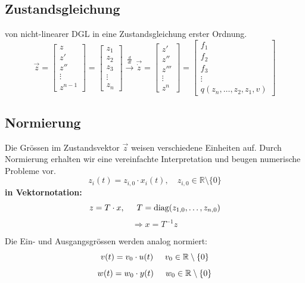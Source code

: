     \subsection{Zustandsgleichung}
	    von nicht-linearer DGL in eine Zustandsgleichung erster Ordnung. 
 	    \[\vec{z} = \begin{bmatrix} z \\ z' \\ z'' \\ \vdots \\z^{n-1} \end{bmatrix}  = \begin{bmatrix} z_1 \\ z_2 \\ z_3 \\ \vdots \\z_n \end{bmatrix}
         \xrightarrow{\frac{d}{dt}} \vec{\dot{z}} = \begin{bmatrix} z' \\ z'' \\ z''' \\ \vdots \\z^{n} \end{bmatrix} = \begin{bmatrix} f_1 \\ f_2 \\ f_3 \\ \vdots \\q(z_n,\hdots,z_2,z_1,v) \end{bmatrix}\]
         
    \subsection{Normierung}
        Die Grössen im Zustandsvektor $\vec{z}$ weisen verschiedene Einheiten auf. Durch Normierung erhalten wir eine vereinfachte Interpretation und beugen numerische Probleme vor. 
        \[z_i(t) = z_{i,0}\cdot x_i(t), \quad z_{i,0} \in\mathbb{R}\setminus\{0\} \] 
        \textbf{in Vektornotation:}
        \[ z = T \cdot x, \hspace{5mm}  T = \textrm{diag}(z_{1,0},\hdots,z_{n,0})\] 
        \[\Rightarrow x=T^{-1}z\]
    
        Die Ein- und Ausgangsgrössen werden analog normiert:
        \[v(t) = v_0 \cdot u(t) \hspace{5mm} v_0 \in\mathbb{R}\setminus\{0\}\]
        \[w(t) = w_0 \cdot y(t) \hspace{5mm} w_0 \in\mathbb{R}\setminus\{0\}\]
    
